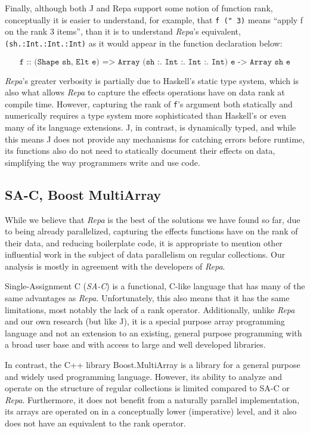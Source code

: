 Finally, although both J and Repa support some notion of function rank, 
conceptually it is easier to understand, for example, 
that \texttt{f (" 3)} means ``apply f on the rank 3 items'', than it is to understand \textit{Repa}'s equivalent, 
\texttt{(sh.:Int.:Int.:Int)} as it would appear in the function declaration below: 

\[\texttt{f :: (Shape sh, Elt e) => Array (sh :. Int :. Int :. Int) e -> Array sh e} \]

\noindent \textit{Repa}'s greater verbosity is partially due to Haskell's static type system, 
which is also what allows \textit{Repa} to capture the effects operations have on data rank at compile time. 
However, capturing the rank of \texttt{f}'s argument both statically and numerically 
requires a type system more sophisticated than Haskell's or even many of its language extensions. %
J, in contrast, is dynamically typed, and while this means J does not provide any mechanisms for catching errors before runtime, 
its functions also do not need to statically document their effects on data, simplifying the way programmers write and use code.

\subsection{SA-C, Boost MultiArray}
While we believe that \textit{Repa} is the best of the solutions we have found so far, 
due to being already parallelized, capturing the effects functions have on the rank of their data, 
and reducing boilerplate code, 
it is appropriate to mention other influential work in the subject of data parallelism on regular collections.
Our analysis is mostly in agreement with the developers of \textit{Repa}\cite{dph}.

Single-Assignment C (\textit{SA-C}) is a functional, C-like language 
that has many of the same advantages as \textit{Repa}\cite{dph}\cite{sac}.
Unfortunately, this also means that it has the same limitations, most notably the lack of a rank operator.
Additionally, unlike \textit{Repa} and our own research (but like J), 
it is a special purpose array programming language and 
not an extension to an existing, general purpose programming with a broad user base and 
with access to large and well developed libraries.

In contrast, the C++ library Boost.MultiArray is a library for a general purpose and widely used programming language\cite{boost}.
However, its ability to analyze and operate on the structure of regular collections is limited compared to SA-C or \textit{Repa}.
Furthermore, it does not benefit from a naturally parallel implementation, 
its arrays are operated on in a conceptually lower (imperative) level, 
and it also does not have an equivalent to the rank operator. 
